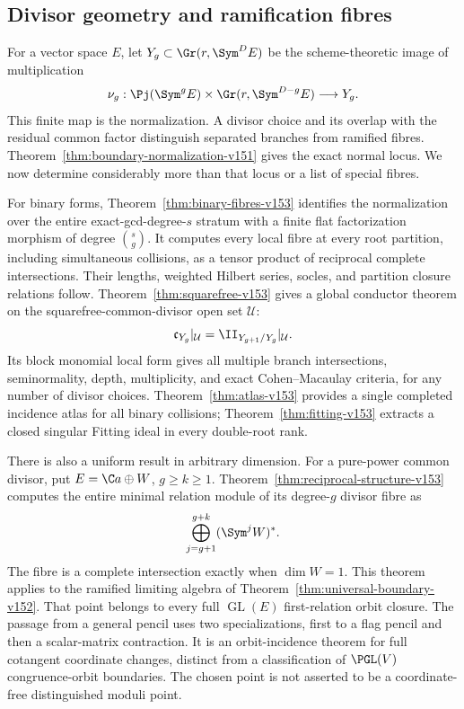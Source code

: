 \subsection{Divisor geometry and ramification fibres}
For a vector space $E$, let $Y_g\subset\Gr(r,\Sym^D E)$ be the
scheme-theoretic image of multiplication
\[
 \nu_g:\Pj(\Sym^g E)\times\Gr(r,\Sym^{D-g}E)\longrightarrow Y_g.
\]
This finite map is the normalization. A divisor choice and its overlap
with the residual common factor distinguish separated branches from
ramified fibres. Theorem~\ref{thm:boundary-normalization-v151} gives
the exact normal locus. We now determine considerably more than that
locus or a list of special fibres.

For binary forms, Theorem~\ref{thm:binary-fibres-v153} identifies the
normalization over the entire exact-gcd-degree-$s$ stratum with a finite
flat factorization morphism of degree $\binom{s}{g}$. It computes every
local fibre at every root partition, including simultaneous collisions,
as a tensor product of reciprocal complete intersections. Their lengths,
weighted Hilbert series, socles, and partition closure relations follow.
Theorem~\ref{thm:squarefree-v153} gives a global conductor theorem on
the squarefree-common-divisor open set $\mathcal U$:
\[
           \mathfrak c_{Y_g}|_{\mathcal U}
                       =\II_{Y_{g+1}/Y_g}|_{\mathcal U}.
\]
Its block monomial local form gives all multiple branch intersections,
seminormality, depth, multiplicity, and exact Cohen--Macaulay criteria,
for any number of divisor choices. Theorem~\ref{thm:atlas-v153}
provides a single completed incidence atlas for all binary collisions;
Theorem~\ref{thm:fitting-v153} extracts a closed singular Fitting ideal
in every double-root rank.

There is also a uniform result in arbitrary dimension. For a pure-power
common divisor, put $E=\C a\oplus W$, $g\geq k\geq1$. Theorem~\ref{thm:reciprocal-structure-v153}
computes the entire minimal relation module of its degree-$g$ divisor
fibre as
\[
             \bigoplus_{j=g+1}^{g+k}(\Sym^jW)^*.
\]
The fibre is a complete intersection exactly when $\dim W=1$.
This theorem applies to the ramified limiting algebra of
Theorem~\ref{thm:universal-boundary-v152}. That point belongs to every
full $\operatorname{GL}(E)$ first-relation orbit closure. The passage
from a general pencil uses two specializations, first to a flag pencil
and then a scalar-matrix contraction. It is an orbit-incidence theorem
for full cotangent coordinate changes, distinct from a classification
of $\PGL(V)$ congruence-orbit boundaries. The chosen point is not
asserted to be a coordinate-free distinguished moduli point.

